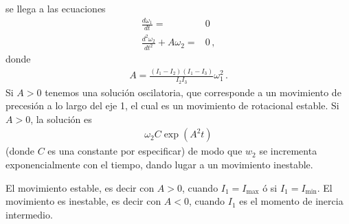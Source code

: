 se llega a las ecuaciones
\begin{align}
  \frac{d\omega_1}{dt}=&0\nonumber\\
  \frac{d^2\omega_2}{dt^2}+A\omega_2=&0\,,
\end{align}
donde
\begin{align}
  A=\frac{(I_1-I_2)(I_1-I_3)}{I_2I_3}\omega_1^2\,.
\end{align}
Si $A>0$ tenemos una solución oscilatoria, que corresponde a un movimiento de precesión a lo largo del eje 1, el cual es un movimiento de rotacional estable. Si $A>0$, la solución es
\begin{align}
  \omega_2 C\exp(A^2 t)
\end{align}
(donde $C$ es una constante por especificar) de modo que $w_2$ se incrementa exponencialmente con el tiempo, dando lugar a un movimiento inestable.

El movimiento estable, es decir con $A>0$, cuando $I_1=I_{\text{max}}$ ó si  $I_1=I_{\text{min}}$. El movimiento es inestable, es decir con $A<0$, cuando $I_1$ es el momento de inercia intermedio.

